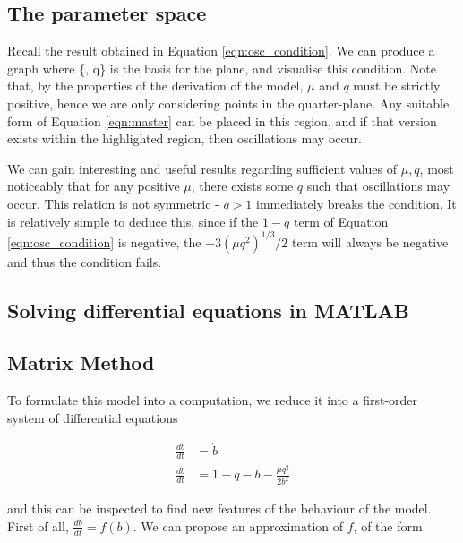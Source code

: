 \documentclass{article}
\begin{document}

\subsection{The parameter space}


Recall the result obtained in Equation \ref{eqn:osc_condition}.
We can produce a graph where \{\mu, q\} is the basis for the plane,
and visualise this condition.
Note that, by the properties of the derivation of the model,
$\mu$ and $q$ must be strictly positive,
hence we are only considering points in the quarter-plane.
Any suitable form of Equation \ref{eqn:master} can be placed in this region,
and if that version exists within the highlighted region,
then oscillations may occur.

We can gain interesting and useful results regarding sufficient values of $\mu, q$,
most noticeably that for any positive $\mu$, there exists some $q$ such that oscillations may occur.
This relation is not symmetric - $q>1$ immediately breaks the condition.
It is relatively simple to deduce this, since if the $1-q$ term of Equation \ref{eqn:osc_condition} is negative,
the $-3(\mu q^2)^{1/3}/2$ term will always be negative and thus the condition fails.

\subsection{Solving differential equations in MATLAB}




\subsection{Matrix Method}

To formulate this model into a computation, we reduce it into a first-order system of differential equations

\begin{align}
    \frac{db}{dt} &= \dot{b} \\
    \frac{d\dot{b}}{dt} &= 1 - q - b - \frac{\mu q^2}{2b^2}
\end{align}

and this can be inspected to find new features of the behaviour of the model.
First of all, $\frac{d\dot{b}}{dt} = f(b)$.
We can propose an approximation of $f$, of the form
\end{document}

